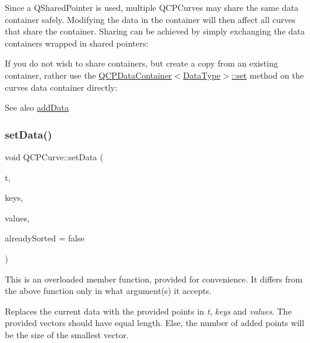 Since a Q\+Shared\+Pointer is used, multiple Q\+C\+P\+Curves may share the same data container safely. Modifying the data in the container will then affect all curves that share the container. Sharing can be achieved by simply exchanging the data containers wrapped in shared pointers\+: 
\begin{DoxyCodeInclude}
\end{DoxyCodeInclude}
 If you do not wish to share containers, but create a copy from an existing container, rather use the \hyperlink{classQCPDataContainer_ae7042bd534fc3ce7befa2ce3f790b5bf}{Q\+C\+P\+Data\+Container$<$\+Data\+Type$>$\+::set} method on the curve\textquotesingle{}s data container directly\+: 
\begin{DoxyCodeInclude}
\end{DoxyCodeInclude}
 \begin{DoxySeeAlso}{See also}
\hyperlink{classQCPCurve_a73edf394b94f3f24f07518e30565a07f}{add\+Data} 
\end{DoxySeeAlso}
\mbox{\label{classQCPCurve_a0768af2c33c8dcffa3cf5bdeb53923a6}} 
\subsubsection{\texorpdfstring{set\+Data()}{setData()}\hspace{0.1cm}{\footnotesize\ttfamily [2/3]}}
{\footnotesize\ttfamily void Q\+C\+P\+Curve\+::set\+Data (\begin{DoxyParamCaption}\item[{const Q\+Vector$<$ double $>$ \&}]{t,  }\item[{const Q\+Vector$<$ double $>$ \&}]{keys,  }\item[{const Q\+Vector$<$ double $>$ \&}]{values,  }\item[{bool}]{already\+Sorted = {\ttfamily false} }\end{DoxyParamCaption})}

This is an overloaded member function, provided for convenience. It differs from the above function only in what argument(s) it accepts.

Replaces the current data with the provided points in {\itshape t}, {\itshape keys} and {\itshape values}. The provided vectors should have equal length. Else, the number of added points will be the size of the smallest vector.

